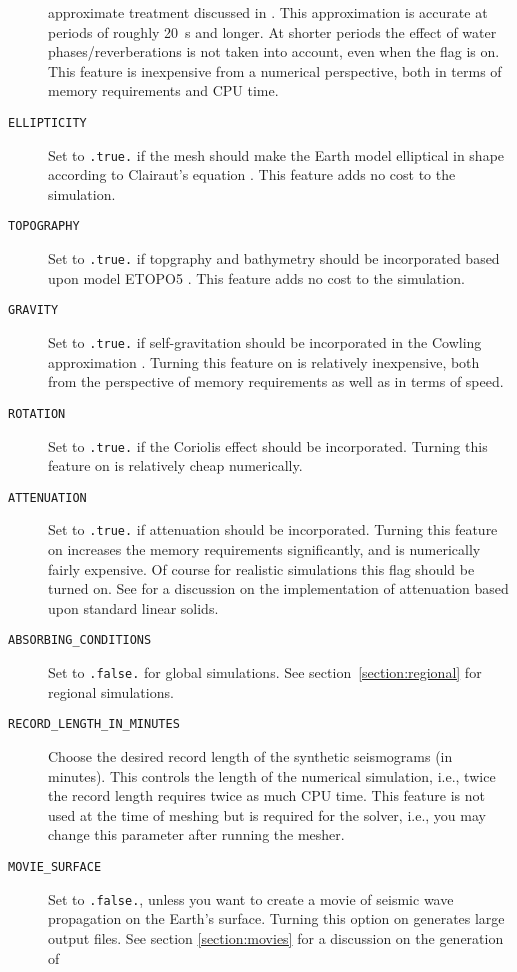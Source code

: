 \documentclass[onecolumn]{article}
\begin{document}
\begin{description}
approximate treatment discussed in \cite{KoTr02b}. This approximation
is accurate at periods of roughly 20~s and longer. At shorter periods the
effect of water phases/reverberations is not taken into account,
even when the flag is on.
This feature is inexpensive from a numerical perspective, both in terms of
memory requirements and CPU time.
\item[\texttt{ELLIPTICITY}] Set to \texttt{.true.} if the mesh should make the
Earth model elliptical in shape according to Clairaut's equation \cite{DaTr98}.
This feature adds no cost to the simulation.
\item[\texttt{TOPOGRAPHY}] Set to \texttt{.true.} if topgraphy and
bathymetry should be incorporated based upon model ETOPO5 \cite{Etopo5}.
This feature adds no cost to the simulation.
\item[\texttt{GRAVITY}] Set to \texttt{.true.} if self-gravitation
should be incorporated in the Cowling approximation \cite{KoTr02b,DaTr98}.
Turning this feature on is relatively inexpensive, both from the perspective
of memory requirements as well as in terms of speed.
\item[\texttt{ROTATION}] Set to \texttt{.true.} if the Coriolis effect should
be incorporated. Turning this feature on is relatively cheap numerically.
\item[\texttt{ATTENUATION}] Set to \texttt{.true.} if attenuation
should be incorporated. Turning this feature on increases the memory
requirements significantly, and is numerically fairly expensive. Of course for
realistic simulations this flag should be turned on.
See \cite{KoTr99,KoTr02a} for a discussion on the implementation of attenuation
based upon standard linear solids.
\item[\texttt{ABSORBING\_CONDITIONS}] Set to \texttt{.false.} for global
simulations. See section~\ref{section:regional} for regional simulations.
\item[\texttt{RECORD\_LENGTH\_IN\_MINUTES}] Choose the desired
record length of the synthetic seismograms (in minutes). This controls the
length of the numerical simulation, i.e., twice the record length requires
twice as much CPU time. This feature is not used at the time of meshing but
is required for the solver, i.e., you may change this parameter after running
the mesher.
\item[\texttt{MOVIE\_SURFACE}] Set to \texttt{.false.}, unless you want to
create a movie of seismic wave propagation on the Earth's surface.
Turning this option on generates large output files.
See section \ref{section:movies} for a discussion on the generation of

\end{description}
\end{document}
